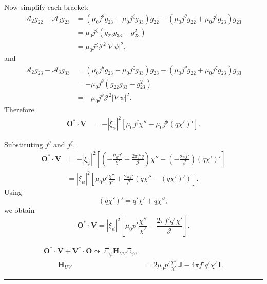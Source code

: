 \documentclass[10pt,a4paper]{article}
\numberwithin{equation}{section}
\begin{document}
Now simplify each bracket:
\begin{align}
\mathcal A_2 g_{22}-\mathcal A_3 g_{23}
&=
(\mu_0j^\theta g_{23}+\mu_0j^\zeta g_{33})g_{22}
-
(\mu_0j^\theta g_{22}+\mu_0j^\zeta g_{23})g_{23} \\
&=
\mu_0j^\zeta(g_{22}g_{33}-g_{23}^2) \\
&=
\mu_0j^\zeta \mathcal J^2 |\nabla\psi|^2,
\end{align}
and
\begin{align}
\mathcal A_2 g_{23}-\mathcal A_3 g_{33}
&=
(\mu_0j^\theta g_{23}+\mu_0j^\zeta g_{33})g_{23}
-
(\mu_0j^\theta g_{22}+\mu_0j^\zeta g_{23})g_{33} \\
&=
-\mu_0j^\theta(g_{22}g_{33}-g_{23}^2) \\
&=
-\mu_0j^\theta \mathcal J^2 |\nabla\psi|^2.
\end{align}
Therefore
\begin{align}
\mathbf O^*\cdot\mathbf V
&=
-|\xi_\psi|^2
\left[
\mu_0j^\zeta\chi''
-
\mu_0j^\theta(q\chi')'
\right].
\end{align}

Substituting $j^\theta$ and $j^\zeta$,
\begin{align}
\mathbf O^*\cdot\mathbf V
&=
-|\xi_\psi|^2
\left[
\left(
-\frac{\mu_0p'}{\chi'}-\frac{2\pi f'q}{\mathcal J}
\right)\chi''
-
\left(
-\frac{2\pi f'}{\mathcal J}
\right)(q\chi')'
\right] \\
&=
|\xi_\psi|^2
\left[
\mu_0p'\frac{\chi''}{\chi'}
+
\frac{2\pi f'}{\mathcal J}
\left(
q\chi''-(q\chi')'
\right)
\right].
\end{align}
Using
\begin{equation}
(q\chi')'=q'\chi'+q\chi'',
\end{equation}
we obtain
\begin{equation}
\boxed{
\mathbf O^*\cdot\mathbf V
=
|\xi_\psi|^2
\left[
\mu_0p'\frac{\chi''}{\chi'}
-
\frac{2\pi f' q'\chi'}{\mathcal J}
\right].
}
\end{equation}

\begin{equation}
\boxed{
\begin{aligned}
\mathbf O^*\cdot\mathbf V+\mathbf V^*\cdot\mathbf O
\leadsto\;
\Xi_\psi^\dagger \mathbf H_{UV}\Xi_\psi, \\
\qquad
\mathbf H_{UV}
&=
2\mu_0p'\frac{\chi''}{\chi'}\,\mathbf J
-4\pi f'q'\chi'\,\mathbf I.
\end{aligned}
}
\end{equation}

\medskip
\noindent\rule{\linewidth}{0.4pt}
\medskip
\end{document}
